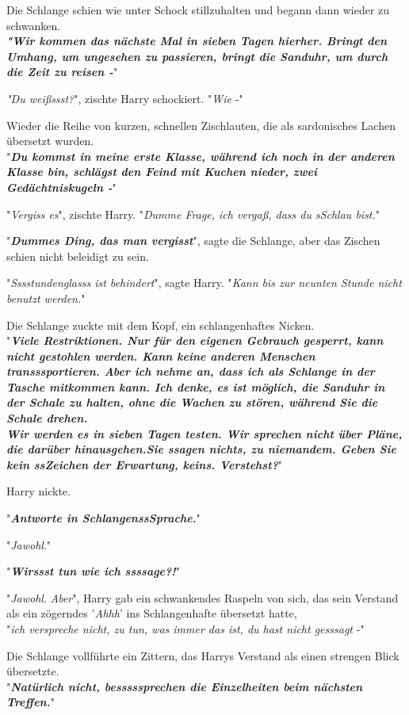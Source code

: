 {Die Schlange schien wie unter Schock stillzuhalten und begann dann wieder zu schwanken.\\ \textbf{\emph{"Wir kommen das nächste Mal in sieben Tagen hierher. Bringt den Umhang, um ungesehen zu passieren, bringt die Sanduhr, um durch die Zeit zu reisen -}}"

\emph{"Du weißssst?}", zischte Harry schockiert. "\emph{Wie} -"

Wieder die Reihe von kurzen, schnellen Zischlauten, die als sardonisches Lachen übersetzt wurden.\\ "\textbf{\emph{Du kommst in meine erste Klasse, während ich noch in der anderen Klasse bin, schlägst den Feind mit Kuchen nieder, zwei Gedächtniskugeln -}}"

"\emph{Vergiss es}", zischte Harry. "\emph{Dumme Frage, ich vergaß, dass du sSchlau bist.}"

"\textbf{\emph{Dummes Ding, das man vergisst}}", sagte die Schlange, aber das Zischen schien nicht beleidigt zu sein.

"\emph{Sssstundenglasss ist behindert}", sagte Harry. "\emph{Kann bis zur neunten Stunde nicht benutzt werden.}"

Die Schlange zuckte mit dem Kopf, ein schlangenhaftes Nicken.\\ "\textbf{\emph{Viele Restriktionen. Nur für den eigenen Gebrauch gesperrt, kann nicht gestohlen werden. Kann keine anderen Menschen transssportieren. Aber ich nehme an, dass ich als Schlange in der Tasche mitkommen kann. Ich denke, es ist möglich, die Sanduhr in der Schale zu halten, ohne die Wachen zu stören, während Sie die Schale drehen.\\ Wir werden es in sieben Tagen testen. Wir sprechen nicht über Pläne, die darüber hinausgehen.Sie ssagen nichts, zu niemandem. Geben Sie kein ssZeichen der Erwartung, keins. Verstehst?}}"

Harry nickte.

"\textbf{\emph{Antworte in SchlangenssSprache.}}"

"\emph{Jawohl}."

"\textbf{\emph{Wirssst tun wie ich ssssage?!}}"

"\emph{Jawohl}. \emph{Aber}", Harry gab ein schwankendes Raspeln von sich, das sein Verstand als ein zögerndes '\emph{Ahhh}' ins Schlangenhafte übersetzt hatte,\\ "\emph{ich verspreche nicht, zu tun, was immer das ist, du hast nicht gesssagt} -"

Die Schlange vollführte ein Zittern, das Harrys Verstand als einen strengen Blick übersetzte.\\ "\textbf{\emph{Natürlich nicht, besssssprechen die Einzelheiten beim nächsten Treffen.}}"

}
